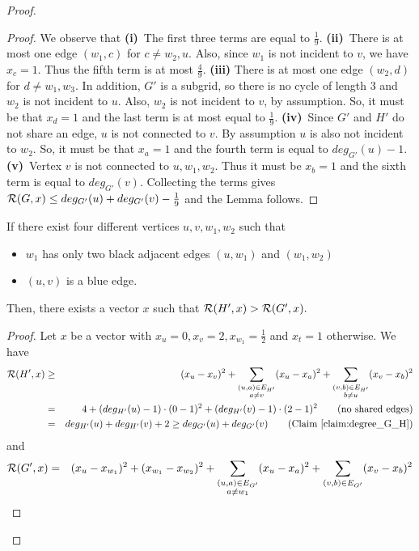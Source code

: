 \begin{proof}
\begin{proof}
We observe that \textbf{(i)}~The first three terms are equal to $\frac{1}{9}$. \textbf{(ii)}~There is at most one edge $(w_1,c)$ for $c\neq w_2,u$. Also, since $w_1$ is not incident to $v$, we have $x_c=1$. Thus the fifth term is at most $\frac{4}{9}$. \textbf{(iii)}  There is at most one edge $(w_2,d)$ for $d\neq w_1,w_3$. In addition, $G'$ is a subgrid, so there is no cycle of length 3 and $w_2$ is not incident to $u$. Also, $w_2$ is not incident to $v$, by assumption. So, it must be that $x_d=1$ and the last term is at most equal to $\frac{1}{9}$. \textbf{(iv)}~Since $G'$ and $H'$ do not share an edge, $u$ is not connected to $v$. By assumption $u$ is also not incident to $w_2$. So, it must be that $x_a=1$ and the fourth term is equal to $deg_{G'}(u)-1$. \textbf{(v)}~Vertex $v$ is not connected to $u, w_1, w_2$. Thus it must be $x_b=1$ and the sixth term is equal to $deg_{G'}(v)$. 
Collecting the terms gives ${\cal R}(G
,x)\leq deg_{G'}(u)+ deg_{G'}(v) -\frac{1}{9}$ and the Lemma follows. 
\end{proof}
\begin{lemma}\label{lem:w2_degree2}
If there exist four different vertices $u,v,w_1,w_2$ such that 
\begin{itemize}
\item $w_1$ has only two black adjacent edges $(u,w_1)$ and $(w_1,w_2)$ 
\item $(u,v)$ is a blue edge.
\end{itemize}
Then, there exists a vector $x$ such that ${\cal R}(H',x)> {\cal R}(G',x).$
\end{lemma}
\begin{proof}
Let $x$ be a vector with $ x_u = 0, x_v = 2, x_{w_1} = \frac{1}{2}$ and $x_t=1$ otherwise. 
We have
\begin{eqnarray*}
{\cal R}(H',x)  & \geq & (x_u - x_v)^2 + \sum_{\substack{(u,a) \in E_{H'}\\ a \neq v}} (x_u - x_a)^2 + 
\sum_{\substack{(v,b)\in E_{H'}\\ b \neq u}} (x_v - x_b)^2\\
& = & 4 + (deg_{H'}(u) - 1) \cdot (0-1)^2 + (deg_{H'}(v) - 1) \cdot (2-1)^2   \mbox{\qquad (no shared edges)}\\
& = & deg_{H'}(u) + deg_{H'}(v) + 2 \geq deg_{G'}(u) + deg_{G'}(v) \mbox{\qquad (Claim~\ref{claim:degree_G_H})}
\end{eqnarray*}
and
\begin{eqnarray*}
{\cal R}(G',x) & = &  (x_u - x_{w_1})^2 + (x_{w_1} - x_{w_2})^2 + \sum_{\substack{(u,a) \in E_{G'}\\ a \neq w_1}} (x_u - x_a)^2 + \sum_{(v,b) \in E_{G'}} (x_v - x_b)^2 
\end{eqnarray*}


\end{proof}
\end{proof}
